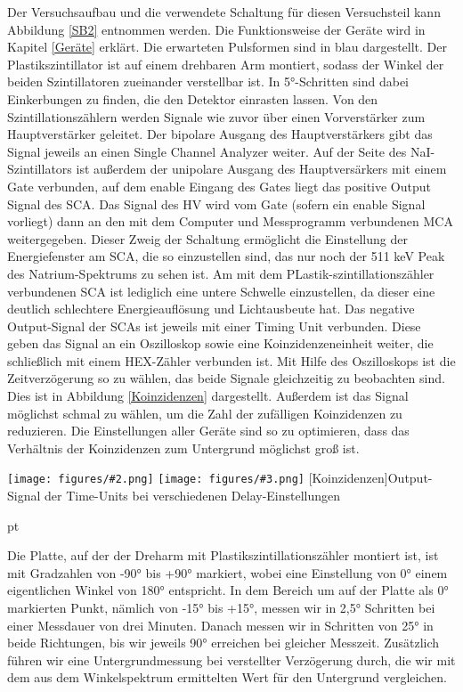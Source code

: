 \documentclass[12pt,listof=totoc]{scrartcl}
\newcommand{\graTwoShort}[5][0.49]{
	\begin{minipage}[h!]{\textwidth}
		\centering
		\texttt{[image: figures/\#2.png]}
		\texttt{[image: figures/\#3.png]}
		\captionof{figure}[#4]{#5}
	\end{minipage}
	\vskip 30 pt
}
\begin{document}
Der Versuchsaufbau und die verwendete Schaltung für diesen Versuchsteil kann Abbildung \ref{SB2} entnommen werden. Die Funktionsweise der Geräte wird in Kapitel \ref{Geräte} erklärt.  Die erwarteten Pulsformen sind in blau dargestellt. Der Plastikszintillator ist auf einem drehbaren Arm montiert, sodass der Winkel der beiden Szintillatoren zueinander verstellbar ist. In 5°-Schritten sind dabei Einkerbungen zu finden, die den Detektor einrasten lassen. Von den Szintillationszählern werden Signale wie zuvor über einen Vorverstärker zum Hauptverstärker geleitet. Der bipolare Ausgang des Hauptverstärkers gibt das Signal jeweils an einen Single Channel Analyzer weiter. Auf der Seite des NaI-Szintillators ist außerdem der unipolare Ausgang des Hauptversärkers mit einem Gate verbunden, auf dem enable Eingang des Gates liegt das positive Output Signal des SCA. Das Signal des HV wird vom Gate (sofern ein enable Signal vorliegt) dann an den mit dem Computer und Messprogramm verbundenen MCA weitergegeben. Dieser Zweig der Schaltung ermöglicht die Einstellung der Energiefenster am SCA, die so einzustellen sind, das nur noch der 511 keV Peak des Natrium-Spektrums zu sehen ist. Am mit dem PLastik-szintillationszähler verbundenen SCA ist lediglich eine untere Schwelle einzustellen, da dieser eine deutlich schlechtere Energieauflösung und Lichtausbeute hat. Das negative Output-Signal der SCAs ist jeweils mit einer Timing Unit verbunden. Diese geben das Signal an ein Oszilloskop sowie eine Koinzidenzeneinheit weiter, die schließlich mit einem HEX-Zähler verbunden ist. Mit Hilfe des Oszilloskops ist die Zeitverzögerung so zu wählen, das beide Signale gleichzeitig zu beobachten sind. Dies ist in Abbildung \ref{Koinzidenzen} dargestellt. Außerdem ist das Signal möglichst schmal zu wählen, um die Zahl der zufälligen Koinzidenzen zu reduzieren. Die Einstellungen aller Geräte sind so zu optimieren, dass das Verhältnis der Koinzidenzen zum Untergrund möglichst groß ist.\\

\graTwoShort[0.5]{Koinzidenzen-1}{Koinzidenzen-2}{Koinzidenzen}{Output-Signal der Time-Units bei verschiedenen Delay-Einstellungen \label{Koinzidenzen}}

Die Platte, auf der der Dreharm mit Plastikszintillationszähler montiert ist, ist mit Gradzahlen von -90° bis +90° markiert, wobei eine Einstellung von 0° einem eigentlichen Winkel von 180° entspricht. In dem Bereich um auf der Platte als 0° markierten Punkt, nämlich von -15° bis +15°, messen wir in 2,5° Schritten bei einer Messdauer von drei Minuten. Danach messen wir in Schritten von 25° in beide Richtungen, bis wir jeweils 90° erreichen bei gleicher Messzeit.
Zusätzlich führen wir eine Untergrundmessung bei verstellter Verzögerung durch, die wir mit dem aus dem Winkelspektrum ermittelten Wert für den Untergrund vergleichen.
\end{document}
